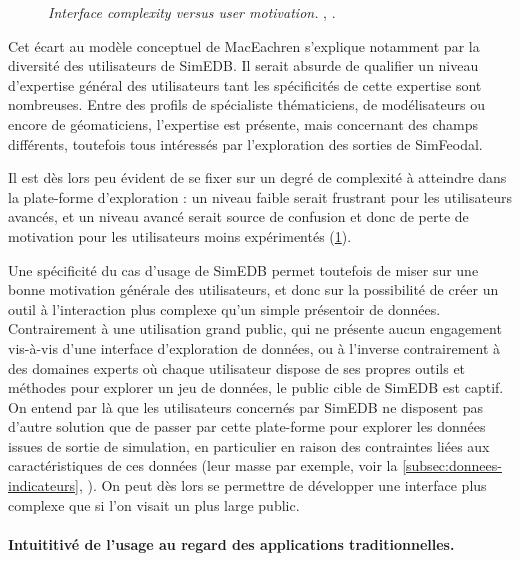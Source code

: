 \begin{figure}[H]
\begin{minipage}[t]{.46\linewidth}
		\caption[\og \textit{Interface complexity versus user motivation. }\fg{}.]{\og \textit{Interface complexity versus user motivation. }\fg{}, \textcite[79]{roth_interactive_2013}.}
		\label{fig:interface-complexity}
	\end{minipage}
	\medskip
\end{figure}

Cet écart au modèle conceptuel de MacEachren s'explique notamment par la diversité des utilisateurs de SimEDB.
Il serait absurde de qualifier un niveau d'expertise général des utilisateurs tant les spécificités de cette expertise sont nombreuses.
Entre des profils de spécialiste thématiciens, de modélisateurs ou encore de géomaticiens, l'expertise est présente, mais concernant des champs différents, toutefois tous intéressés par l'exploration des sorties de SimFeodal.

Il est dès lors peu évident de se fixer sur un degré de complexité à atteindre dans la plate-forme d'exploration : un niveau faible serait frustrant pour les utilisateurs avancés, et un niveau avancé serait source de confusion et donc de perte de motivation pour les utilisateurs moins expérimentés (\cref{fig:interface-complexity}).

Une spécificité du cas d'usage de SimEDB permet toutefois de miser sur une bonne motivation générale des utilisateurs, et donc sur la possibilité de créer un outil à l'interaction plus complexe qu'un simple présentoir de données.
Contrairement à une utilisation grand public, qui ne présente aucun engagement vis-à-vis d'une interface d'exploration de données, ou à l'inverse contrairement à des domaines experts où chaque utilisateur dispose de ses propres outils et méthodes pour explorer un jeu de données, le public cible de SimEDB est \og captif\fg{}.
On entend par là que les utilisateurs concernés par SimEDB ne disposent pas d'autre solution que de passer par cette plate-forme pour explorer les données issues de sortie de simulation, en particulier en raison des contraintes liées aux caractéristiques de ces données (leur masse par exemple, voir la \cref{subsec:donnees-indicateurs}, ).
On peut dès lors se permettre de développer une interface plus complexe que si l'on visait un plus large public.

\paragraph{Intuititivé de l'usage au regard des applications traditionnelles.}

